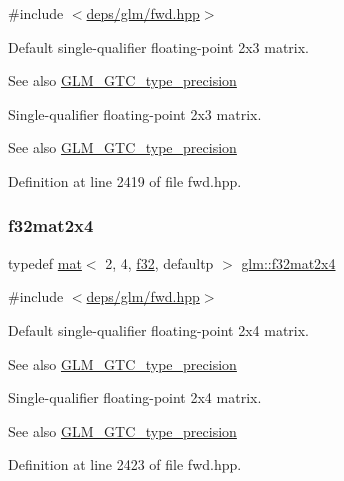 {\ttfamily \#include $<$\hyperlink{fwd_8hpp}{deps/glm/fwd.\+hpp}$>$}

Default single-\/qualifier floating-\/point 2x3 matrix. \begin{DoxySeeAlso}{See also}
\hyperlink{group__gtc__type__precision}{G\+L\+M\+\_\+\+G\+T\+C\+\_\+type\+\_\+precision}
\end{DoxySeeAlso}
Single-\/qualifier floating-\/point 2x3 matrix. \begin{DoxySeeAlso}{See also}
\hyperlink{group__gtc__type__precision}{G\+L\+M\+\_\+\+G\+T\+C\+\_\+type\+\_\+precision} 
\end{DoxySeeAlso}


Definition at line 2419 of file fwd.\+hpp.

\mbox{\label{group__gtc__type__precision_ga56deb277c1d5c1f42a80982372b4ed6c}} 
\subsubsection{\texorpdfstring{f32mat2x4}{f32mat2x4}}
{\footnotesize\ttfamily typedef \hyperlink{structglm_1_1mat}{mat}$<$ 2, 4, \hyperlink{group__gtc__type__precision_ga0ec999b57f5330d9021256e96038df04}{f32}, defaultp $>$ \hyperlink{group__gtc__type__precision_ga56deb277c1d5c1f42a80982372b4ed6c}{glm\+::f32mat2x4}}



{\ttfamily \#include $<$\hyperlink{fwd_8hpp}{deps/glm/fwd.\+hpp}$>$}

Default single-\/qualifier floating-\/point 2x4 matrix. \begin{DoxySeeAlso}{See also}
\hyperlink{group__gtc__type__precision}{G\+L\+M\+\_\+\+G\+T\+C\+\_\+type\+\_\+precision}
\end{DoxySeeAlso}
Single-\/qualifier floating-\/point 2x4 matrix. \begin{DoxySeeAlso}{See also}
\hyperlink{group__gtc__type__precision}{G\+L\+M\+\_\+\+G\+T\+C\+\_\+type\+\_\+precision} 
\end{DoxySeeAlso}


Definition at line 2423 of file fwd.\+hpp.

\mbox{\label{group__gtc__type__precision_gaf4cf4ab937cf94a202e7decd85cf1e6d}} 
